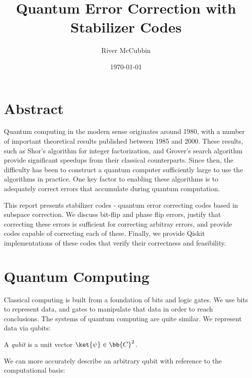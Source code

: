 \documentclass{article}
\title{Quantum Error Correction with Stabilizer Codes}
\author{River McCubbin}
\date{\today}
\begin{document}
\maketitle

\section{Abstract}

Quantum computing in the modern sense originates around 1980, with a number of important theoretical results published between 1985 and 2000.
These results, such as Shor's algorithm for integer factorization, and Grover's search algorithm provide significant speedups from their classical counterparts.
Since then, the difficulty has been to construct a quantum computer sufficiently large to use the algorithms in practice.
One key factor to enabling these algorithms is to adequately correct errors that accumulate during quantum computation.

This report presents stabilizer codes - quantum error correcting codes based in subspace correction.
We discuss bit-flip and phase flip errors, justify that correcting these errors is sufficient for correcting arbitray errors, and provide codes capable of correcting each of these.
Finally, we provide Qiskit implementations of these codes that verify their correctness and feasibility.

\section{Quantum Computing}

        Classical computing is built from a foundation of bits and logic gates.
        We use bits to represent data, and gates to manipulate that data in order to reach conclusions.
        The systems of quantum computing are quite similar.
        We represent data via qubits:

        \begin{definition}[Qubit]
                A \textit{qubit} is a unit vector $\ket{\psi} \in \bb{C}^2$.
        \end{definition}

        We can more accurately describe an arbitrary qubit with reference to the computational basis:
        
\end{document}
